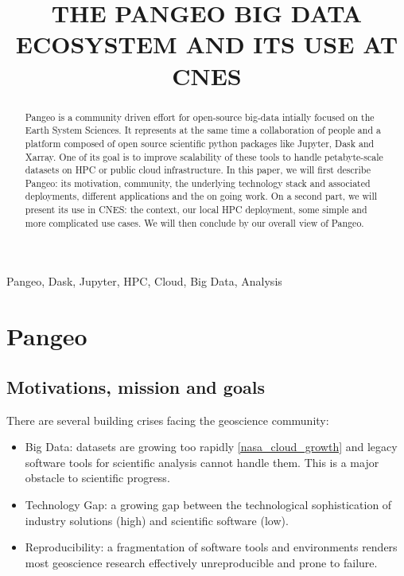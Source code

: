\documentclass{article}
\title{THE PANGEO BIG DATA ECOSYSTEM AND ITS USE AT CNES}
\begin{document}
%
\maketitle
%
\begin{abstract}
Pangeo\cite{b1} is a community driven effort for open-source big-data intially focused on the Earth System Sciences. It represents at the same time a collaboration of people and a platform composed of open source scientific python packages like Jupyter, Dask and Xarray. One of its goal is to improve scalability of these tools to handle petabyte-scale datasets on HPC or public cloud infrastructure.
In this paper, we will first describe Pangeo: its motivation, community, the underlying technology stack and associated deployments, different applications and the on going work. On a second part, we will present its use in CNES: the context, our local HPC deployment, some simple and more complicated use cases. We will then conclude by our overall view of Pangeo.
\end{abstract}
%
\begin{keywords}
Pangeo, Dask, Jupyter, HPC, Cloud, Big Data, Analysis
\end{keywords}
%
\section{Pangeo}
\label{sec:pangeo}

\subsection{Motivations, mission and goals}
\label{ssec:motivations}

There are several building crises facing the geoscience community:

\begin{itemize}
\item Big Data: datasets are growing too rapidly \ref{nasa_cloud_growth} and legacy software tools for scientific analysis cannot handle them. This is a major obstacle to scientific progress.
\item Technology Gap: a growing gap between the technological sophistication of industry solutions (high) and scientific software (low).
\item Reproducibility: a fragmentation of software tools and environments renders most geoscience research effectively unreproducible and prone to failure.
\end{itemize}
\end{document}
